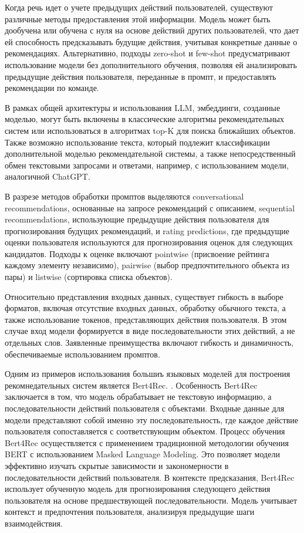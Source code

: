 Когда речь идет о учете предыдущих действий пользователей, существуют различные методы предоставления этой информации. Модель может быть дообучена или обучена с нуля на основе действий других пользователей, что дает ей способность предсказывать будущие действия, учитывая конкретные данные о рекомендациях. Альтернативно, подходы zero-shot и few-shot предусматривают использование модели без дополнительного обучения, позволяя ей анализировать предыдущие действия пользователя, переданные в промпт, и предоставлять рекомендации по команде.

В рамках общей архитектуры и использования LLM, эмбеддинги, созданные моделью, могут быть включены в классические алгоритмы рекомендательных систем или использоваться в алгоритмах top-K для поиска ближайших объектов. Также возможно использование текста, который подлежит классификации дополнительной моделью рекомендательной системы, а также непосредственный обмен текстовыми запросами и ответами, например, с использованием модели, аналогичной ChatGPT.

В разрезе методов обработки промптов выделяются conversational recommendations, основанные на запросе рекомендаций с описанием, sequential recommendations, использующие предыдущие действия пользователя для прогнозирования будущих рекомендаций, и rating predictions, где предыдущие оценки пользователя используются для прогнозирования оценок для следующих кандидатов. Подходы к оценке включают pointwise (присвоение рейтинга каждому элементу независимо), pairwise (выбор предпочтительного объекта из пары) и listwise (сортировка списка объектов).

Относительно представления входных данных, существует гибкость в выборе форматов, включая отсутствие входных данных, обработку обычного текста, а также использование токенов, представляющих действия пользователя. В этом случае вход модели формируется в виде последовательности этих действий, а не отдельных слов. Заявленные преимущества включают гибкость и динамичность, обеспечиваемые использованием промптов.

Одним из примеров использования большиъ языковых моделей для построения рекомнедательных систем является Bert4Rec. \cite{bert4rec}. Особенность Bert4Rec заключается в том, что модель обрабатывает не текстовую информацию, а последовательности действий пользователя с объектами. Входные данные для модели представляют собой именно эту последовательность, где каждое действие пользователя сопоставляется с соответствующим объектом. Процесс обучения Bert4Rec осуществляется с применением традиционной методологии обучения BERT с использованием Masked Language Modeling. Это позволяет модели эффективно изучать скрытые зависимости и закономерности в последовательности действий пользователя. В контексте предсказания, Bert4Rec использует обученную модель для прогнозирования следующего действия пользователя на основе предшествующей последовательности. Модель учитывает контекст и предпочтения пользователя, анализируя предыдущие шаги взаимодействия.

